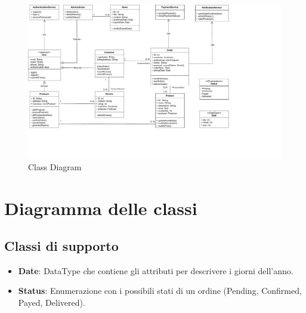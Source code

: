 
\begin{landscape}
\begin{figure}[!ht]
    \centering
    \includegraphics[trim= 0cm 4.3cm 7.3cm 0cm, clip, width=0.97\linewidth]{Deliverables/second-deliverable/img/Class-Diagram.drawio.pdf}
    \caption{Class Diagram}
\end{figure}

\end{landscape}

\restoregeometry

\newpage

\section{Diagramma delle classi}
\subsection{Classi di supporto}

\begin{itemize}
    \item \textbf{Date}: DataType che contiene gli attributi per descrivere i giorni dell'anno.
    
    \item \textbf{Status}: Enumerazione con i possibili stati di un ordine (Pending, Confirmed, Payed, Delivered).
\end{itemize}

